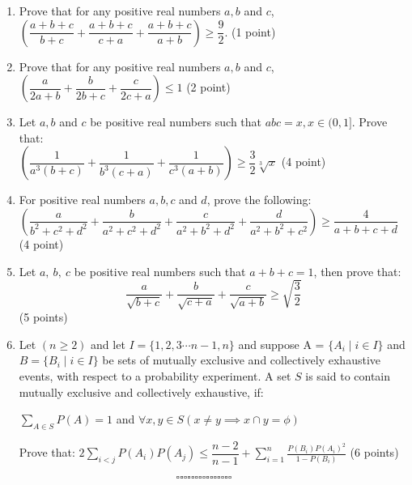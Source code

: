 \documentclass[12pt]{article}
\begin{document}
\begin{enumerate}
    \item Prove that for any positive real numbers $a,b$ and $c$,\\ $\left(\dfrac{a+b+c}{b+c}+\dfrac{a+b+c}{c+a}+\dfrac{a+b+c}{a+b}\right) \geq \dfrac{9}{2}.$ (1 point)\\
    \item Prove that for any positive real numbers $a,b$ and $c$,\\ $\left(\dfrac{a}{2a+b}+\dfrac{b}{2b+c}+\dfrac{c}{2c+a}\right) \leq 1$ (2 point)\\
    \item Let $a,b$ and $c$ be positive real numbers such that $abc = x, x\in (0,1]$. Prove that:\\
    $\left(\dfrac{1}{a^3(b+c)}+\dfrac{1}{b^3(c+a)}+\dfrac{1}{c^3(a+b)}\right) \geq \dfrac{3}{2}\sqrt[3]{x}$ (4 point)\\
    \item For positive real numbers $a,b,c$ and $d$, prove the following:\\
    $\left(\dfrac{a}{b^2+c^2+d^2}+\dfrac{b}{a^2+c^2+d^2}+\dfrac{c}{a^2+b^2+d^2}+\dfrac{d}{a^2+b^2+c^2}\right) \geq \dfrac{4}{a+b+c+d}$ (4 point)\\
    
    \item Let $a ,\ b,\ c$ be positive real numbers such that $a+b+c=1$, then prove that:\\
    $$\displaystyle\frac{a}{\sqrt{b+c}}+\frac{b}{\sqrt{c+a}}+\frac{c}{\sqrt{a+b}}\geq 
    \sqrt{\frac{3}{2}}$$ (5 points)\\
    
    \item Let $(n\geq 2)$ and let $I = \{1,2,3\cdots n-1,n\} $ and suppose  A = $\{A_i \mid i \in I\}$ and $B = \{B_i \mid i \in I\}$ be sets of mutually exclusive and collectively exhaustive events, with respect to a probability experiment. A set $S$ is said to contain mutually exclusive and collectively exhaustive, if:
    \begin{center}
    $\displaystyle\sum_{A \in S} P(A) = 1$ and $\forall x,y \in S \left(x \neq y \implies x \displaystyle \cap y = \phi\right)$
    \end{center}
    Prove that:
    $2\displaystyle\sum_{i<j}P(A_i)P(A_j) \leq \dfrac{n-2}{n-1} + \sum_{i=1}^{n}\frac{P(B_i)P(A_i)^2}{1-P(B_i)}$ (6 points)
\end{enumerate}
$$\square \square \square \square \square \square \square \square \square \square \square \square \square \square \square $$
\end{document}
